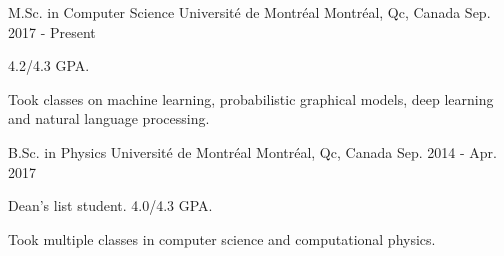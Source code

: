\begin{cventries}
  \cventry
    {M.Sc. in Computer Science}
    {Universit\'e de Montr\'eal}
    {Montr\'eal, Qc, Canada}
    {Sep. 2017 - Present}
    {
      \begin{cvitems}
        \item {4.2/4.3 GPA.}
        \item {Took classes on machine learning, probabilistic graphical models, deep learning and natural language processing.}
      \end{cvitems}
    }

  \cventry
    {B.Sc. in Physics}
    {Universit\'e de Montr\'eal}
    {Montr\'eal, Qc, Canada}
    {Sep. 2014 - Apr. 2017}
    {
      \begin{cvitems}
        \item {Dean's list student. 4.0/4.3 GPA.}
        \item {Took multiple classes in computer science and computational physics.}
      \end{cvitems}
    }
\end{cventries}
